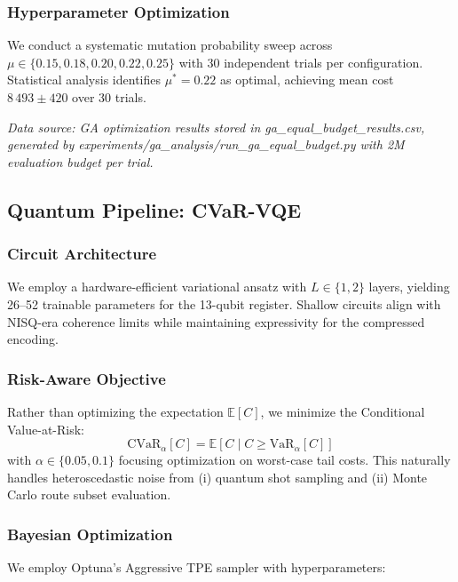 \subsubsection{Hyperparameter Optimization}
We conduct a systematic mutation probability sweep across $\mu \in \{0.15, 0.18, 0.20, 0.22, 0.25\}$ with 30 independent trials per configuration.
Statistical analysis identifies $\mu^* = 0.22$ as optimal, achieving mean cost $8\,493 \pm 420$ over 30 trials.

\textit{Data source: GA optimization results stored in ga\_equal\_budget\_results.csv, generated by experiments/ga\_analysis/run\_ga\_equal\_budget.py with 2M evaluation budget per trial.}

\subsection{Quantum Pipeline: CVaR-VQE}

\subsubsection{Circuit Architecture}
We employ a hardware-efficient variational ansatz with $L \in \{1, 2\}$ layers, yielding 26--52 trainable parameters for the 13-qubit register.
Shallow circuits align with NISQ-era coherence limits while maintaining expressivity for the compressed encoding.

\subsubsection{Risk-Aware Objective}
Rather than optimizing the expectation $\mathbb{E}[C]$, we minimize the Conditional Value-at-Risk:
\[
\text{CVaR}_\alpha[C] = \mathbb{E}[C \mid C \geq \text{VaR}_\alpha[C]]
\]
with $\alpha \in \{0.05, 0.1\}$ focusing optimization on worst-case tail costs.
This naturally handles heteroscedastic noise from (i) quantum shot sampling and (ii) Monte Carlo route subset evaluation.

\subsubsection{Bayesian Optimization}
We employ Optuna's Aggressive TPE sampler with hyperparameters:

